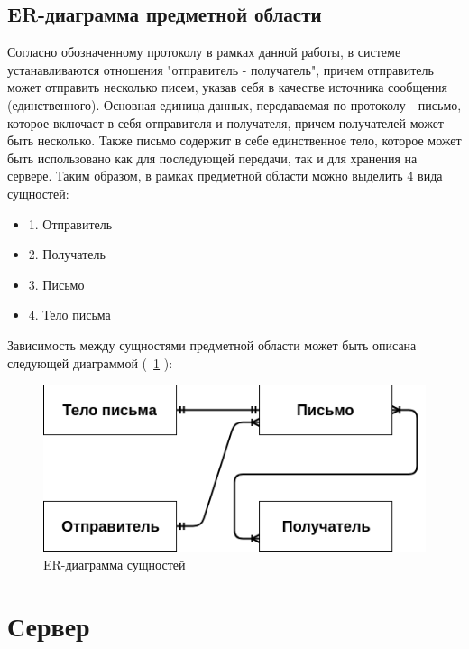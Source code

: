 \documentclass[a4paper,12pt]{report}
\begin{document}
\subsection*{ER-диаграмма предметной области}
Согласно обозначенному протоколу в рамках данной работы, в системе устанавливаются отношения "отправитель - получатель", причем отправитель может отправить несколько писем, указав себя в качестве источника сообщения (единственного). Основная единица данных, передаваемая по протоколу - письмо, которое включает в себя отправителя и получателя, причем получателей может быть несколько. Также письмо содержит в себе единственное тело, которое может быть использовано как для последующей передачи, так и для хранения на сервере.
Таким образом, в рамках предметной области можно выделить 4 вида сущностей:
\begin{itemize}
    \item 1. Отправитель
    \item 2. Получатель
    \item 3. Письмо
    \item 4. Тело письма
\end{itemize}
Зависимость между сущностями предметной области может быть описана следующей диаграммой (~\ref{fig:er_diagram} ):
\begin{figure}
\centering
\includegraphics[width=\textwidth]{static/ER_diagram_field.png}
\caption{ER-диаграмма сущностей}
\label{fig:er_diagram}
\end{figure}

\section*{Сервер}
\end{document}
